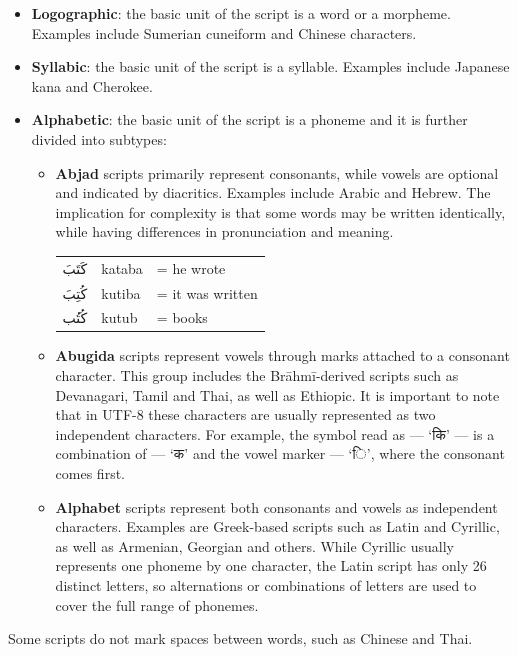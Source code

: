 \begin{itemize}
    \item \textbf{Logographic}: the basic unit of the script is a word or a morpheme. Examples include Sumerian cuneiform and Chinese characters.
    \item \textbf{Syllabic}: the basic unit of the script is a syllable. Examples include Japanese kana and Cherokee.
    \item \textbf{Alphabetic}: the basic unit of the script is a phoneme and it is further divided into subtypes:
    \begin{itemize}
        \item \textbf{Abjad} scripts primarily represent consonants, while vowels are optional and indicated by diacritics. Examples include Arabic and Hebrew. The implication for complexity is that some words may be written identically, while having differences in pronunciation and meaning.
        
\begin{tabular}{lll}
\textarabic{كَتَبَ} & kataba & = he wrote \\
\textarabic{كُتِبَ} & kutiba & = it was written \\
\textarabic{كُتُب}  & kutub  & = books \\
\end{tabular}
        \item \textbf{Abugida} scripts represent vowels through marks attached to a consonant character. This group includes the Brāhmī-derived scripts such as Devanagari, Tamil and Thai, as well as Ethiopic. It is important to note that in UTF-8 these characters are usually represented as two independent characters. For example, the symbol read as  --- `\textsanskrit{कि}' --- is a combination of  --- `\textsanskrit{क}' and the vowel marker  --- `\textsanskrit{ि}', where the consonant comes first.
        \item  \textbf{Alphabet} scripts represent both consonants and vowels as independent characters. Examples are Greek-based scripts such as Latin and Cyrillic, as well as Armenian, Georgian and others. While Cyrillic usually represents one phoneme by one character, the Latin script has only 26 distinct letters, so alternations or combinations of letters are used to cover the full range of phonemes.
    \end{itemize}
\end{itemize}

Some scripts do not mark spaces between words, such as Chinese and Thai.

